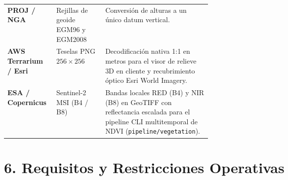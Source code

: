 \documentclass[10pt,a4paper]{article}
\begin{document}
\begin{tabularx}{\linewidth}{@{}p{0.24\linewidth}p{0.24\linewidth}L@{}}
\textbf{PROJ / NGA} & Rejillas de geoide EGM96 y EGM2008 & Conversión de alturas a un único datum vertical. \\
\textbf{AWS Terrarium / Esri} & Teselas PNG $256\times256$ & Decodificación nativa 1:1 en metros para el visor de relieve 3D en cliente y recubrimiento óptico Esri World Imagery. \\
\textbf{ESA / Copernicus} & Sentinel-2 MSI (B4 / B8) & Bandas locales RED (B4) y NIR (B8) en GeoTIFF con reflectancia escalada para el pipeline CLI multitemporal de NDVI (\texttt{pipeline/vegetation}). \\
\bottomrule
\end{tabularx}
\normalsize

\section*{6. Requisitos y Restricciones Operativas}
\end{document}
